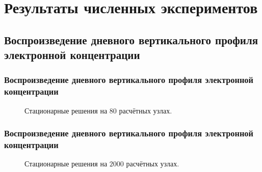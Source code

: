 \documentclass[9pt, apectratio=43,unicode]{beamer}
\begin{document}
\section{Результаты численных экспериментов}
\subsection{Воспроизведение дневного вертикального профиля электронной концентрации}
\begin{frame}\frametitle{Воспроизведение дневного вертикального профиля электронной концентрации}

\begin{figure}[H]
\caption{Стационарные решения на $80$ расчётных узлах.}
\end{figure}


\end{frame}

\begin{frame}\frametitle{Воспроизведение дневного вертикального профиля электронной концентрации}

\begin{figure}[H]
\caption{Стационарные решения на $2000$ расчётных узлах.}
\end{figure}
\end{frame}
\end{document}
